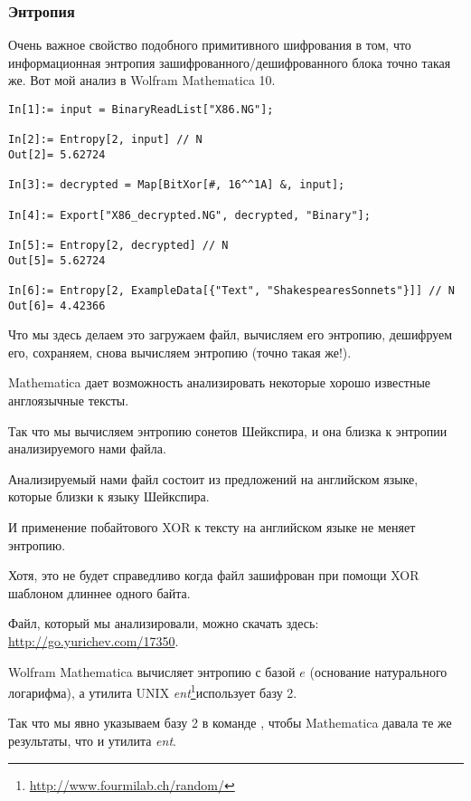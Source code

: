 \subsubsection{Энтропия}

Очень важное свойство подобного примитивного шифрования в том, что информационная энтропия
зашифрованного/дешифрованного блока точно такая же.
Вот мой анализ в Wolfram Mathematica 10.

\begin{lstlisting}[caption=Wolfram Mathematica 10,style=custommath]
In[1]:= input = BinaryReadList["X86.NG"];

In[2]:= Entropy[2, input] // N
Out[2]= 5.62724

In[3]:= decrypted = Map[BitXor[#, 16^^1A] &, input];

In[4]:= Export["X86_decrypted.NG", decrypted, "Binary"];

In[5]:= Entropy[2, decrypted] // N
Out[5]= 5.62724

In[6]:= Entropy[2, ExampleData[{"Text", "ShakespearesSonnets"}]] // N
Out[6]= 4.42366
\end{lstlisting}

Что мы здесь делаем это загружаем файл, вычисляем его энтропию, дешифруем его, сохраняем, снова вычисляем энтропию (точно такая же!).

Mathematica дает возможность анализировать некоторые хорошо известные англоязычные тексты.

Так что мы вычисляем энтропию сонетов Шейкспира, и она близка к энтропии анализируемого нами файла.

Анализируемый нами файл состоит из предложений на английском языке, которые близки к языку
Шейкспира.

И применение побайтового XOR к тексту на английском языке не меняет энтропию.


Хотя, это не будет справедливо когда файл зашифрован при помощи XOR шаблоном длиннее одного байта.

Файл, который мы анализировали, можно скачать здесь: \url{http://go.yurichev.com/17350}.


\newcommand{\FNENTURL}{\footnote{\url{http://www.fourmilab.ch/random/}}}

Wolfram Mathematica вычисляет энтропию с базой $e$ (основание натурального логарифма),
а утилита UNIX \emph{ent}\FNENTURL использует базу 2.

Так что мы явно указываем базу 2 в команде , чтобы Mathematica давала те же результаты, что и утилита \emph{ent}.
